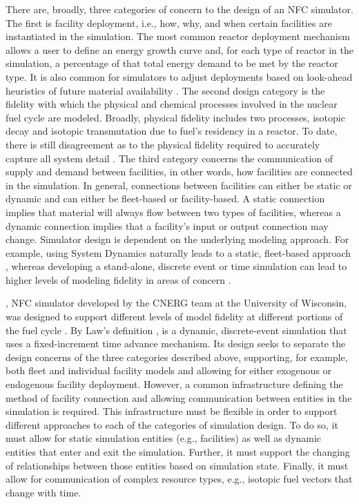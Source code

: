 There are, broadly, three categories of concern to the design of an NFC
simulator. The first is facility deployment, i.e., how, why, and when certain
facilities are instantiated in the simulation. The most common reactor
deployment mechanism allows a user to define an energy growth curve and, for
each type of reactor in the simulation, a percentage of that total energy demand
to be met by the reactor type. It is also common for simulators to adjust
deployments based on look-ahead heuristics of future material availability
\cite{schweitzer_improved_2008, van_den_durpel_daness_2009}. The second design
category is the fidelity with which the physical and chemical processes involved
in the nuclear fuel cycle are modeled. Broadly, physical fidelity includes two
processes, isotopic decay and isotopic transmutation due to fuel's residency in
a reactor. To date, there is still disagreement as to the physical fidelity
required to accurately capture all system detail \cite{guerin_impact_2009}. The
third category concerns the communication of supply and demand between
facilities, in other words, how facilities are connected in the simulation. In
general, connections between facilities can either be static or dynamic and can
either be fleet-based or facility-based. A static connection implies that
material will always flow between two types of facilities, whereas a dynamic
connection implies that a facility's input or output connection may
change. Simulator design is dependent on the underlying modeling approach. For
example, using System Dynamics \cite{forrester1971counterintuitive} naturally
leads to a static, fleet-based approach \cite{busquim_e_silva_system_2008,
  durpel_daness_2003, yacout_vision_2006}, whereas developing a stand-alone,
discrete event or time simulation \cite{Law:1999:SMA:554952} can lead to higher
levels of modeling fidelity in areas of concern \cite{schneider_nfcsim:_2005,
  mouginot2012class, boucher_cosi:_2006}.

\Cyclus, NFC simulator developed by the CNERG team at the University of
Wisconsin, was designed to support different levels of model fidelity at
different portions of the fuel cycle \cite{huff_cyclus_2015}. By Law's
definition \cite{Law:1999:SMA:554952}, \Cyclus is a dynamic, discrete-event
simulation that uses a fixed-increment time advance mechanism. Its design seeks
to separate the design concerns of the three categories described above,
supporting, for example, both fleet and individual facility models and allowing
for either exogenous or endogenous facility deployment. However, a common
infrastructure defining the method of facility connection and allowing
communication between entities in the simulation is required. This
infrastructure must be flexible in order to support different approaches to each
of the categories of simulation design. To do so, it must allow for static
simulation entities (e.g., facilities) as well as dynamic entities that enter
and exit the simulation. Further, it must support the changing of relationships
between those entities based on simulation state. Finally, it must allow for
communication of complex resource types, e.g., isotopic fuel vectors that change
with time.

